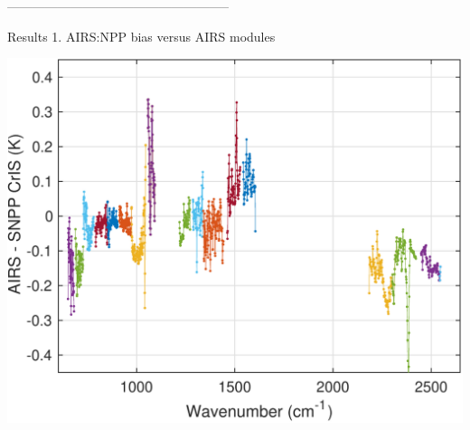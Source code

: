 \documentclass[10pt,t]{beamer}
\begin{document}



-----------------------------------------------------
\begin{frame}{Results 1. AIRS:NPP bias versus AIRS modules}

\vspace{-0.1in}
  \begin{center}
    \includegraphics[width=0.7\linewidth]{./Strow/airs_minus_cris_airs_array_colors.pdf}
\end{center}
  \end{frame}
\end{document}

